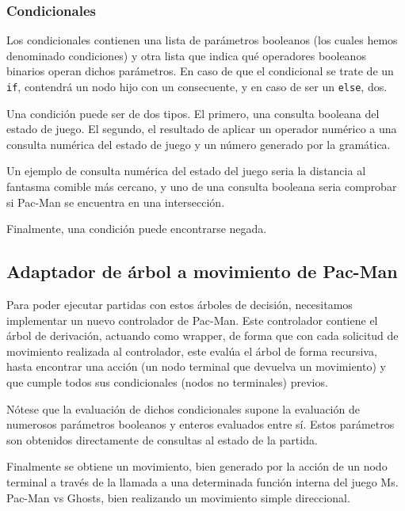 \subsubsection{Condicionales}
Los condicionales contienen una lista de parámetros booleanos (los cuales hemos denominado condiciones) y otra lista que indica qué operadores booleanos binarios operan dichos parámetros. En caso de que el condicional se trate de un \texttt{if}, contendrá un nodo hijo con un consecuente, y en caso de ser un \texttt{else}, dos.

Una condición puede ser de dos tipos. El primero, una consulta booleana del estado de juego. El segundo, el resultado de aplicar un operador numérico a una consulta numérica del estado de juego y un número generado por la gramática.
 
Un ejemplo de consulta numérica del estado del juego seria la distancia al fantasma comible más cercano, y uno de una consulta booleana seria comprobar si Pac-Man se encuentra en una intersección.

Finalmente, una condición puede encontrarse negada.

\subsection{Adaptador de árbol a movimiento de Pac-Man}
Para poder ejecutar partidas con estos árboles de decisión, necesitamos implementar un nuevo controlador de Pac-Man. Este controlador contiene el árbol de derivación, actuando como wrapper, de forma que con cada solicitud de movimiento realizada al controlador, este evalúa el árbol de forma recursiva, hasta encontrar una acción (un nodo terminal que devuelva un movimiento) y que cumple todos sus condicionales (nodos no terminales) previos.

Nótese  que la evaluación de dichos condicionales supone la evaluación de numerosos parámetros booleanos y enteros evaluados entre sí. Estos parámetros son obtenidos directamente de consultas al estado de la partida.

Finalmente se obtiene un movimiento, bien generado por la acción de un nodo terminal a través de la llamada a una determinada función interna del juego Ms. Pac-Man vs Ghosts, bien realizando un movimiento simple direccional.

